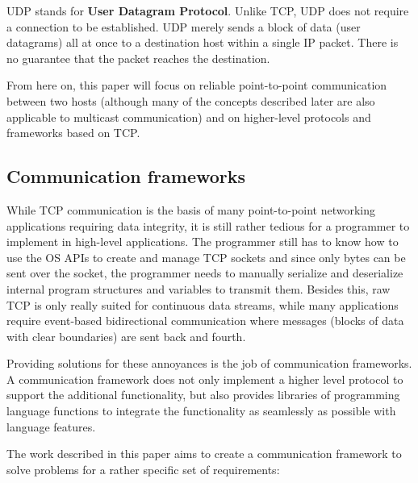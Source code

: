 \documentclass[conference]{IEEEtran}
\begin{document}
UDP stands for \textbf{User Datagram Protocol}. Unlike TCP, UDP does not require a connection to be established. UDP merely sends a block of data (user datagrams) all at once to a destination host within a single IP packet. There is no guarantee that the packet reaches the destination. 

From here on, this paper will focus on reliable point-to-point communication between two hosts (although many of the concepts described later are also applicable to multicast communication) and on higher-level protocols and frameworks based on TCP.


\subsection{Communication frameworks}

While TCP communication is the basis of many point-to-point networking applications requiring data integrity, it is still rather tedious for a programmer to implement in high-level applications. The programmer still has to know how to use the OS APIs to create and manage TCP sockets and since only bytes can be sent over the socket, the programmer needs to manually serialize and deserialize internal program structures and variables to transmit them. Besides this, raw TCP is only really suited for continuous data streams, while many applications require event-based bidirectional communication where messages (blocks of data with clear boundaries) are sent back and fourth.

Providing solutions for these annoyances is the job of communication frameworks. A communication framework does not only implement a higher level protocol to support the additional functionality, but also provides libraries of programming language functions to integrate the functionality as seamlessly as possible with language features.

The work described in this paper aims to create a communication framework to solve problems for a rather specific set of requirements:
\end{document}
